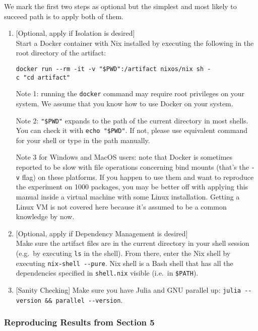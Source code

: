 \documentclass[
]{article}
\begin{document}
We mark the first two steps as optional but the simplest and most likely
to succeed path is to apply both of them.

\begin{enumerate}
\def\labelenumi{\arabic{enumi}.}
\item
  {[}Optional, apply if Isolation is desired{]}\\
  Start a Docker container with Nix installed by executing the following
  in the root directory of the artifact:

  \texttt{docker\ run\ -\/-rm\ -it\ -v\ "\$PWD":/artifact\ nixos/nix\ sh\ -c\ "cd\ artifact"}

  Note 1: running the \texttt{docker} command may require root
  privileges on your system. We assume that you know how to use Docker
  on your system.

  Note 2: \texttt{"\$PWD"} expands to the path of the current directory
  in most shells. You can check it with \texttt{echo\ "\$PWD"}. If not,
  please use equivalent command for your shell or type in the path
  manually.

  Note 3 for Windows and MacOS users: note that Docker is sometimes
  reported to be slow with file operations concerning bind mounts
  (that's the \texttt{-v} flag) on these platforms. If you happen to use
  them and want to reproduce the experiment on 1000 packages, you may be
  better off with applying this manual inside a virtual machine with
  some Linux installation. Getting a Linux VM is not covered here
  because it's assumed to be a common knowledge by now.
\item
  {[}Optional, apply if Dependency Management is desired{]}\\
  Make sure the artifact files are in the current directory in your
  shell session (e.g.~by executing \texttt{ls} in the shell). From
  there, enter the Nix shell by executing \texttt{nix-shell\ -\/-pure}.
  Nix shell is a Bash shell that has all the dependencies specified in
  \texttt{shell.nix} visible (i.e.~in \texttt{\$PATH}).
\item
  {[}Sanity Checking{]} Make sure you have Julia and GNU parallel up:
  \texttt{julia\ -\/-version\ \&\&\ parallel\ -\/-version}.
\end{enumerate}

\hypertarget{reproducing-results-from-section-5}{%
\subsubsection{Reproducing Results from Section
5}\label{reproducing-results-from-section-5}}
\end{document}
